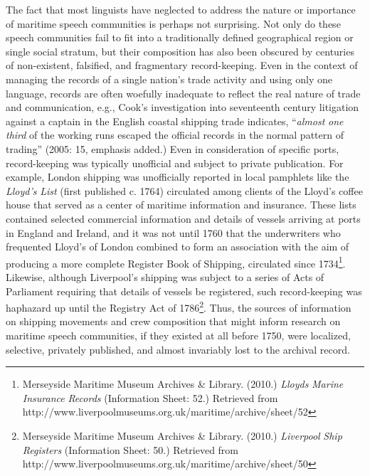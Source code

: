 The fact that most linguists have neglected to address the nature or importance of maritime speech communities is perhaps not surprising. Not only do these speech communities fail to fit into a traditionally defined geographical region or single social stratum, but their composition has also been obscured by centuries of non-existent, falsified, and fragmentary record-keeping. Even in the context of managing the records of a single nation’s trade activity and using only one language, records are often woefully inadequate to reflect the real nature of trade and communication, e.g., Cook’s investigation into seventeenth century litigation against a captain in the English coastal shipping trade indicates, “\textit{almost} \textit{one} \textit{third} of the working runs escaped the official records in the normal pattern of trading” (2005: 15, emphasis added.) Even in consideration of specific ports, record-keeping was typically unofficial and subject to private publication. For example, London shipping was unofficially reported in local pamphlets like the \textit{Lloyd's} \textit{List} (first published c. 1764) circulated among clients of the Lloyd’s coffee house that served as a center of maritime information and insurance. These lists contained selected commercial information and details of vessels arriving at ports in England and Ireland, and it was not until 1760 that the underwriters who frequented Lloyd’s of London combined to form an association with the aim of producing a more complete Register Book of Shipping, circulated since 1734\footnote{Merseyside Maritime Museum Archives \& Library. (2010.)  \textit{Lloyds} \textit{Marine} \textit{Insurance} \textit{Records} (Information Sheet: 52.) Retrieved from http://www.liverpoolmuseums.org.uk/maritime/archive/sheet/52}. Likewise, although Liverpool’s shipping was subject to a series of Acts of Parliament requiring that details of vessels be registered, such record-keeping was haphazard up until the Registry Act of 1786\footnote{Merseyside Maritime Museum Archives \& Library. (2010.)  \textit{Liverpool} \textit{Ship} \textit{Registers} (Information Sheet: 50.) Retrieved from http://www.liverpoolmuseums.org.uk/maritime/archive/sheet/50}. Thus, the sources of information on shipping movements and crew composition that might inform research on maritime speech communities, if they existed at all before 1750, were localized, selective, privately published, and almost invariably lost to the archival record. 

